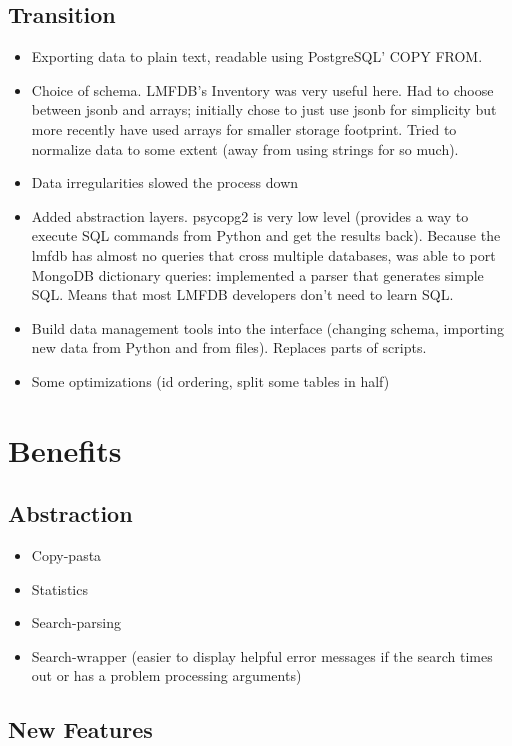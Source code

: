 \documentclass{article}
\begin{document}
\subsection{Transition}

\begin{itemize}
\item Exporting data to plain text, readable using PostgreSQL' COPY FROM.
\item Choice of schema.  LMFDB's Inventory was very useful here.  Had to choose between jsonb and arrays; initially chose to just use jsonb for simplicity but more recently have used arrays for smaller storage footprint.  Tried to normalize data to some extent (away from using strings for so much). 
\item Data irregularities slowed the process down
\item Added abstraction layers.  psycopg2 is very low level (provides a way to execute SQL commands from Python and get the results back).  Because the lmfdb has almost no queries that cross multiple databases, was able to port MongoDB dictionary queries: implemented a parser that generates simple SQL.  Means that most LMFDB developers don't need to learn SQL.
\item Build data management tools into the interface (changing schema, importing new data from Python and from files).  Replaces parts of scripts.
\item Some optimizations (id ordering, split some tables in half)
\end{itemize}

\section{Benefits}

\subsection{Abstraction}

\begin{itemize}
\item Copy-pasta
\item Statistics
\item Search-parsing
\item Search-wrapper (easier to display helpful error messages if the search times out or has a problem processing arguments)
\end{itemize}

\subsection{New Features}
\end{document}
